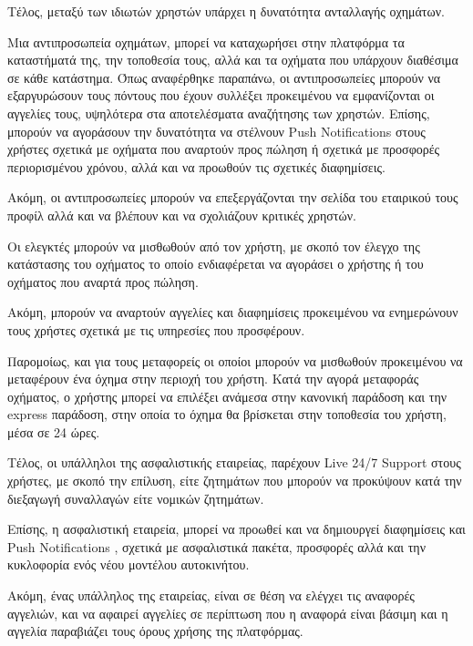 \documentclass{../ol-softwaremanual}
\begin{document}
	Τέλος, μεταξύ των ιδιωτών χρηστών υπάρχει η δυνατότητα ανταλλαγής οχημάτων. \break
	
	\vspace{5pt}
	
	Μια αντιπροσωπεία οχημάτων, μπορεί να καταχωρήσει στην πλατφόρμα τα καταστήματά της, την τοποθεσία τους, αλλά και τα οχήματα που υπάρχουν διαθέσιμα σε κάθε κατάστημα. \break 
	Όπως αναφέρθηκε παραπάνω, οι αντιπροσωπείες μπορούν να εξαργυρώσουν τους πόντους που έχουν συλλέξει προκειμένου να εμφανίζονται οι αγγελίες τους, υψηλότερα στα αποτελέσματα αναζήτησης των χρηστών. Επίσης, μπορούν να αγοράσουν την δυνατότητα να στέλνουν \en Push Notifications \gr στους χρήστες σχετικά με οχήματα που αναρτούν προς πώληση ή σχετικά με προσφορές περιορισμένου χρόνου, αλλά και να προωθούν τις σχετικές διαφημίσεις. \break
	
	Ακόμη, οι αντιπροσωπείες μπορούν να επεξεργάζονται την σελίδα του εταιρικού τους προφίλ αλλά και να βλέπουν και να σχολιάζουν κριτικές χρηστών.	 \break 
	
	\vspace{5pt}	
	
	Οι ελεγκτές μπορούν να μισθωθούν από τον χρήστη, με σκοπό τον έλεγχο της κατάστασης του οχήματος το οποίο ενδιαφέρεται να αγοράσει ο χρήστης ή του οχήματος που αναρτά προς πώληση. \break
	
	Ακόμη, μπορούν να αναρτούν αγγελίες και διαφημίσεις προκειμένου να ενημερώνουν τους χρήστες σχετικά με τις υπηρεσίες που προσφέρουν. \break
	
	Παρομοίως, και για τους μεταφορείς οι οποίοι μπορούν να μισθωθούν προκειμένου να μεταφέρουν ένα όχημα στην περιοχή του χρήστη. Κατά την αγορά μεταφοράς οχήματος, ο χρήστης μπορεί να επιλέξει ανάμεσα στην κανονική παράδοση και την \en express \gr παράδοση, στην οποία το όχημα θα βρίσκεται στην τοποθεσία του χρήστη, μέσα σε 24 ώρες.		\break
	
	
	Τέλος, οι υπάλληλοι της ασφαλιστικής εταιρείας, παρέχουν \en Live 24/7 Support \gr στους χρήστες, με σκοπό την επίλυση, είτε ζητημάτων που μπορούν να προκύψουν κατά την διεξαγωγή συναλλαγών είτε νομικών ζητημάτων. \break
	
	Επίσης, η ασφαλιστική εταιρεία, μπορεί να προωθεί και να δημιουργεί διαφημίσεις και \en Push Notifications \gr, σχετικά με ασφαλιστικά πακέτα, προσφορές αλλά και την κυκλοφορία ενός νέου μοντέλου αυτοκινήτου. \break
	
	Ακόμη, ένας υπάλληλος της εταιρείας, είναι σε θέση να ελέγχει τις αναφορές αγγελιών, και να αφαιρεί αγγελίες σε περίπτωση που η αναφορά είναι βάσιμη και η αγγελία παραβιάζει τους όρους χρήσης της πλατφόρμας. \break
	
\end{document}
